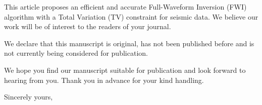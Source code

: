 \documentclass[11pt]{letter} %
\begin{document}
\begin{letter}


This article proposes an efficient and accurate Full-Waveform Inversion (FWI) algorithm with a Total Variation (TV) constraint for seismic data.
We believe our work will be of interest to the readers of your journal.



We declare that this manuscript is original, has not been published before
and is not currently being considered for publication.

We hope you find our manuscript suitable for publication and look forward to hearing from you.
Thank you in advance for your kind handling.
\closing{Sincerely yours,}


\encl{}  				%

\end{letter}
\end{document}
